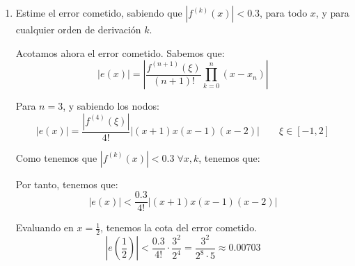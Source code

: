 \begin{ejercicio}
\begin{enumerate}
        
    
        \item Estime el error cometido, sabiendo que $|f^{(k)}(x)| < 0.3$, para todo $x$, y para cualquier orden de derivación $k$.

        Acotamos ahora el error cometido. Sabemos que:
        \begin{equation*}
            |e(x)| = \left|\frac{f^{(n+1)}(\xi)}{(n+1)!}\prod_{k=0}^n(x-x_n) \right|
        \end{equation*}
    
        Para $n=3$, y sabiendo los nodos:
        \begin{equation*}
            |e(x)| = \frac{|f^{(4)}(\xi)|}{4!}\left|(x+1)x(x-1)(x-2) \right| \qquad \xi \in [-1,2]
        \end{equation*}
    
        Como tenemos que $|f^{(k)}(x)|<0.3 \; \forall x,k$, tenemos que:
    
        Por tanto, tenemos que:
        \begin{equation*}
            |e(x)| < \frac{0.3}{4!}\left|(x+1)x(x-1)(x-2) \right|
        \end{equation*}
        
    
        Evaluando en $x=\frac{1}{2}$, tenemos la cota del error cometido.
        \begin{equation*}
            \left|e\left(\frac{1}{2}\right)\right| < \frac{0.3}{4!}\cdot \frac{3^2}{2^4} = \frac{3^2}{2^8\cdot 5} \approx 0.00703
        \end{equation*}
    \end{enumerate}
\end{ejercicio}
